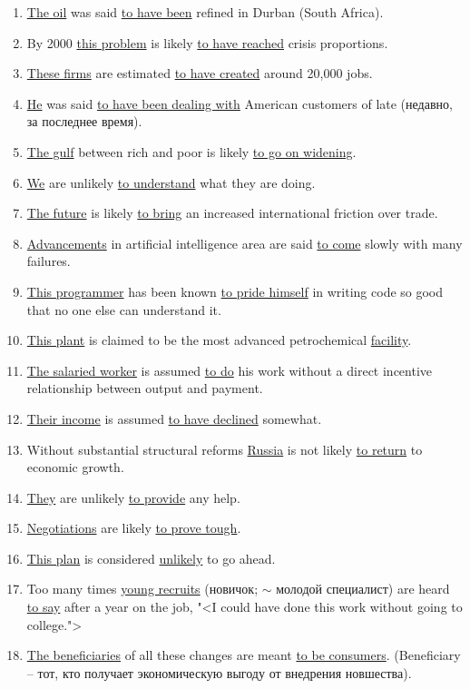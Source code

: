\documentclass[main.tex]{subfiles}
\begin{document}
\begin{enumerate}[nosep,leftmargin=*]
	\itemsep\eitsp
	\item \uline{The oil} was said \uline{to have been} refined in Durban (South Africa).
	\item By 2000 \uline{this problem} is likely \uline{to have reached} crisis proportions.
	\item \uline{These firms} are estimated \uline{to have created} around 20,000 jobs.
	\item \uline{He} was said \uline{to have been dealing with} American customers of late (недавно, за последнее время).
	\item \uline{The gulf} between rich and poor is likely \uline{to go on widening}.
	\item \uline{We} are unlikely \uline{to understand} what they are doing.
	\item \uline{The future} is likely \uline{to bring} an increased international friction over trade.
	\item \uline{Advancements} in artificial intelligence area are said \uline{to come} slowly with many failures.
	\item \uline{This programmer} has been known \uline{to pride himself} in writing code so good that no one else can understand it.
	\item \uline{This plant} is claimed to be the most advanced petrochemical \uline{facility}.
	\item \uline{The salaried worker} is assumed \uline{to do} his work without a direct incentive relationship between output and payment.
	\item \uline{Their income} is assumed \uline{to have declined} somewhat.
	\item Without substantial structural reforms \uline{Russia} is not likely \uline{to return} to economic growth.
	\item \uline{They} are unlikely \uline{to provide} any help.
	\item \uline{Negotiations} are likely \uline{to prove tough}.
	\item \uline{This plan} is considered \uline{unlikely} to go ahead.
	\item Too many times \uline{young recruits} (новичок; $\sim$ молодой специалист) are heard \uline{to say} after a year on the job, "<I could have done this work without going to college.">
	\item \uline{The beneficiaries} of all these changes are meant \uline{to be consumers}. (Beneficiary -- тот, кто получает экономическую выгоду от внедрения новшества).

\end{enumerate}
\end{document}
